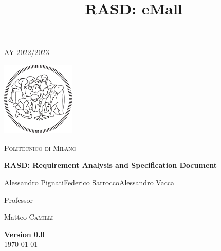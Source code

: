 \documentclass{article}
\title{\textbf{RASD: eMall}}
\begin{document}
\begin{titlepage}
    \centering
    {\scshape\large AY 2022/2023 \par}
    \vfill
    \includegraphics[width=100pt]{img/logo-polimi-new}\par\vspace{1cm}
    {\scshape\LARGE Politecnico di Milano \par}
    \vspace{1.5cm}
    {\huge\bfseries RASD\@: Requirement Analysis
        and Specification Document \par}
    \vspace{2cm}
    {\large {Alessandro Pignati\quad Federico Sarrocco\quad Alessandro Vacca}\par}
    \vfill
    {\large Professor\par
        Matteo \textsc{Camilli}}
    \vfill
    {\large \textbf{Version 0.0}\\ \today \par}
\end{titlepage}
\clearpage
\tableofcontents
{}
\clearpage
{}





\end{document}
